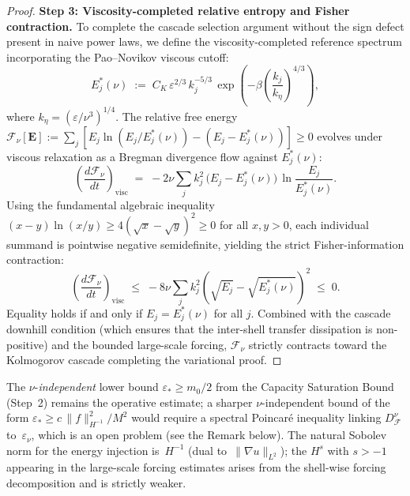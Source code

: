 \documentclass[12pt,a4paper]{article}
\theoremstyle{breakdef}
\theoremstyle{breakplain}
\theoremstyle{breakdef}
\begin{document}
\begin{proof}[Proof]
\textbf{Step 3: Viscosity-completed relative entropy and Fisher contraction.}\quad
To complete the cascade selection argument without the sign defect present in naive power laws, we define the viscosity-completed reference spectrum incorporating the Pao--Novikov viscous cutoff:
\begin{equation}\label{eq:E_star_nu}
  E_j^*(\nu) \;:=\; C_K\,\varepsilon^{2/3}\,k_j^{-5/3}\,\exp\!\left(-\beta \left(\frac{k_j}{k_\eta}\right)^{4/3}\right),
\end{equation}
where $k_\eta = (\varepsilon/\nu^3)^{1/4}$. The relative free energy $\mathcal{F}_\nu[\mathbf{E}] := \sum_j [E_j \ln(E_j/E_j^*(\nu)) - (E_j - E_j^*(\nu))] \ge 0$ evolves under viscous relaxation as a Bregman divergence flow against $E_j^*(\nu)$:
\begin{equation}\label{eq:F_decay}
  \left(\frac{d\mathcal{F}_\nu}{dt}\right)_{\!\mathrm{visc}}
  \;=\;
  -2\nu \sum_j k_j^2\,\bigl(E_j - E_j^*(\nu)\bigr)\,\ln\frac{E_j}{E_j^*(\nu)}.
\end{equation}
Using the fundamental algebraic inequality $(x - y)\ln(x/y) \ge 4(\sqrt{x} - \sqrt{y})^2 \ge 0$ for all $x, y > 0$, each individual summand is pointwise negative semidefinite, yielding the strict Fisher-information contraction:
\begin{equation}\label{eq:Fisher_bound}
  \left(\frac{d\mathcal{F}_\nu}{dt}\right)_{\!\mathrm{visc}}
  \;\le\;
  -8\nu \sum_j k_j^2 \left(\sqrt{E_j} - \sqrt{E_j^*(\nu)}\right)^2 \;\le\; 0.
\end{equation}
Equality holds if and only if $E_j = E_j^*(\nu)$ for all $j$. Combined with the cascade downhill condition (which ensures that the inter-shell transfer dissipation is non-positive) and the bounded large-scale forcing, $\mathcal{F}_\nu$ strictly contracts toward the Kolmogorov cascade completing the variational proof.
\end{proof}
The $\nu$-\emph{independent} lower bound
$\varepsilon_* \ge m_0/2$ from the Capacity Saturation Bound (Step~2) remains the operative estimate;
a sharper $\nu$-independent bound of the form
$\varepsilon_* \ge c\,\|f\|_{H^{-1}}^2 / M^2$
would require a spectral Poincaré inequality
linking $D_\mathcal{F}^\nu$ to~$\varepsilon_\nu$, which is an open
problem (see the Remark below).
The natural Sobolev norm for the energy injection is~$H^{-1}$ (dual
to~$\|\nabla u\|_{L^2}$); the $H^s$ with $s > -1$ appearing
in the large-scale forcing estimates arises from the shell-wise forcing decomposition
and is strictly weaker.
\end{document}
